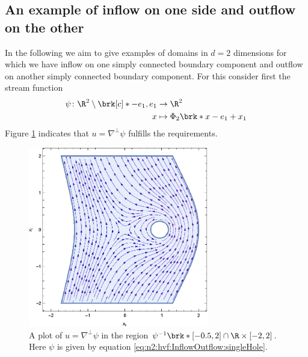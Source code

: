 \subsection{An example of inflow on one side and outflow on the other}
In the following we aim to give examples of domains in $d=2$ dimensions for which 
we have inflow on one simply connected boundary component and outflow on another simply connected boundary
component.
For this consider first the stream function
\begin{equation}
  \begin{aligned}
  \psi\colon \R^2\setminus\brk[c]*{-e_1,e_1}&\to\R^2 \\
  x&\mapsto\Phi_2\brk*{x-e_1}+x_1
  \end{aligned}\label{eq:n2:hvf:InflowOutflow:singleHole}
\end{equation}
Figure \ref{pl:n2_hvf_InflowOutflow_asymmetric_single} indicates that $u=\nabla^\perp\psi$ fulfills the
requirements.
\begin{figure}
  \centering
  \includegraphics[width=0.7\textwidth]{../Plots/HarmonicVectorFields_gr3.eps}
  \caption{A plot of $u=\nabla^\perp\psi$ in the region $\psi^{-1}\brk*{[-0.5,2]}\cap \R\times[-2,2]$.
  Here $\psi$ is given by equation \eqref{eq:n2:hvf:InflowOutflow:singleHole}.}
  \label{pl:n2_hvf_InflowOutflow_asymmetric_single}
\end{figure}

